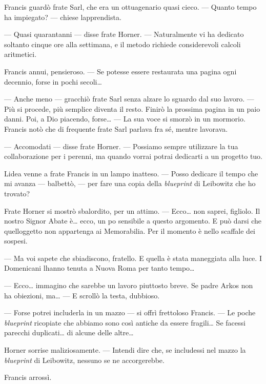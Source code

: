 Francis guardò frate Sarl, che era un ottuagenario quasi cieco. ---
Quanto tempo ha impiegato? --- chiese l\textquotesingle apprendista.

--- Quasi quarant\textquotesingle anni --- disse frate Horner. ---
Naturalmente vi ha dedicato soltanto cinque ore alla settimana, e il
metodo richiede considerevoli calcoli aritmetici.

Francis annui, pensieroso. --- Se potesse essere restaurata una pagina
ogni decennio, forse in pochi secoli\ldots{}

--- Anche meno --- gracchiò frate Sarl senza alzare lo sguardo dal suo
lavoro. --- Più si procede, più semplice diventa il resto. Finirò la
prossima pagina in un paio d\textquotesingle anni. Poi, a Dio piacendo,
forse\ldots{} --- La sua voce si smorzò in un mormorio. Francis notò che
di frequente frate Sarl parlava fra sé, mentre lavorava.

--- Accomodati --- disse frate Horner. --- Possiamo sempre utilizzare la
tua collaborazione per i perenni, ma quando vorrai potrai dedicarti a un
progetto tuo.

L\textquotesingle idea venne a frate Francis in un lampo inatteso. ---
Posso dedicare il tempo che mi avanza --- balbettò, --- per fare una
copia della \emph{blueprint} di Leibowitz che ho trovato?

Frate Horner si mostrò sbalordito, per un attimo. --- Ecco\ldots{} non
saprei, figliolo. Il nostro Signor Abate è\ldots{} ecco, un
po\textquotesingle{} sensibile a questo argomento. E può darsi che
quell\textquotesingle oggetto non appartenga ai Memorabilia. Per il
momento è nello scaffale dei sospesi.

--- Ma voi sapete che sbiadiscono, fratello. E quella è stata maneggiata
alla luce. I Domenicani l\textquotesingle hanno tenuta a Nuova Roma per
tanto tempo\ldots{}

--- Ecco\ldots{} immagino che sarebbe un lavoro piuttosto breve. Se
padre Arkos non ha obiezioni, ma\ldots{} --- E scrollò la testa,
dubbioso.

--- Forse potrei includerla in un mazzo --- si offrì frettoloso Francis.
--- Le poche \emph{blueprint} ricopiate che abbiamo sono così antiche da
essere fragili\ldots{} Se facessi parecchi duplicati\ldots{} di alcune
delle altre\ldots{}

Horner sorrise maliziosamente. --- Intendi dire che, se includessi nel
mazzo la \emph{blueprint} di Leibowitz, nessuno se ne accorgerebbe.

Francis arrossì.

